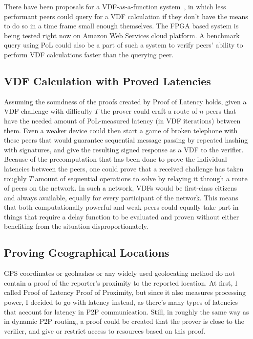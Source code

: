 There have been proposals for a VDF-as-a-function system~\cite{Devlin2020-qw}, in which less performant peers could query for a VDF calculation if they don't have the means to do so in a time frame small enough themselves. The FPGA based system is being tested right now on Amazon Web Services cloud platform. A benchmark query using PoL could also be a part of such a system to verify peers' ability to perform VDF calculations faster than the querying peer.

\subsection{VDF Calculation with Proved Latencies}
Assuming the soundness of the proofs created by Proof of Latency holds, given a VDF challenge with difficulty \(T\) the prover could craft a route of \(n\) peers that have the needed amount of PoL-measured latency (in VDF iterations) between them. Even a weaker device could then start a game of broken telephone with these peers that would guarantee sequential message passing by repeated hashing with signatures, and give the resulting signed response as a VDF to the verifier. Because of the precomputation that has been done to prove the individual latencies between the peers, one could prove that a received challenge has taken roughly \(T\) amount of sequential operations to solve by relaying it through a route of peers on the network. In such a network, VDFs would be first-class citizens and always available, equally for every participant of the network. This means that both computationally powerful and weak peers could equally take part in things that require a delay function to be evaluated and proven without either benefiting from the situation disproportionately.

\subsection{Proving Geographical Locations}
GPS coordinates or geohashes or any widely used geolocating method do not contain a proof of the reporter's proximity to the reported location. At first, I called Proof of Latency Proof of Proximity, but since it also measures processing power, I decided to go with latency instead, as there's many types of latencies that account for latency in P2P communication. Still, in roughly the same way as in dynamic P2P routing, a proof could be created that the prover is close to the verifier, and give or restrict access to resources based on this proof.

